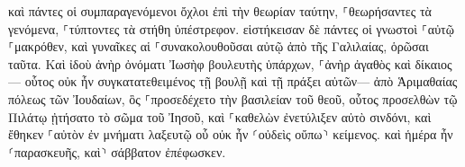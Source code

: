 \documentclass{openreader}
\begin{document}
καὶ πάντες οἱ συμπαραγενόμενοι ὄχλοι ἐπὶ τὴν θεωρίαν ταύτην, ⸀θεωρήσαντες τὰ γενόμενα, ⸀τύπτοντες τὰ στήθη ὑπέστρεφον. 
εἱστήκεισαν δὲ πάντες οἱ γνωστοὶ ⸀αὐτῷ ⸀μακρόθεν, καὶ γυναῖκες αἱ ⸀συνακολουθοῦσαι αὐτῷ ἀπὸ τῆς Γαλιλαίας, ὁρῶσαι ταῦτα. 
Καὶ ἰδοὺ ἀνὴρ ὀνόματι Ἰωσὴφ βουλευτὴς ὑπάρχων, ⸀ἀνὴρ ἀγαθὸς καὶ δίκαιος— 
οὗτος οὐκ ἦν συγκατατεθειμένος τῇ βουλῇ καὶ τῇ πράξει αὐτῶν— ἀπὸ Ἁριμαθαίας πόλεως τῶν Ἰουδαίων, ὃς ⸀προσεδέχετο τὴν βασιλείαν τοῦ θεοῦ, 
οὗτος προσελθὼν τῷ Πιλάτῳ ᾐτήσατο τὸ σῶμα τοῦ Ἰησοῦ, 
καὶ ⸀καθελὼν ἐνετύλιξεν αὐτὸ σινδόνι, καὶ ἔθηκεν ⸀αὐτὸν ἐν μνήματι λαξευτῷ οὗ οὐκ ἦν ⸂οὐδεὶς οὔπω⸃ κείμενος. 
καὶ ἡμέρα ἦν ⸂παρασκευῆς, καὶ⸃ σάββατον ἐπέφωσκεν. 
\end{document}
